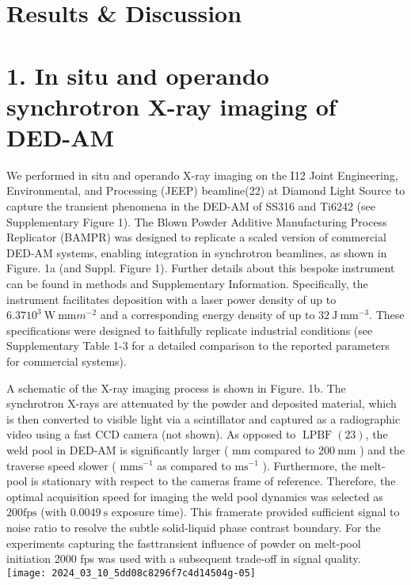 \documentclass[10pt]{article}
\begin{document}
\section*{Results \& Discussion}
\section*{1. In situ and operando synchrotron X-ray imaging of DED-AM}
We performed in situ and operando X-ray imaging on the I12 Joint Engineering, Environmental, and Processing (JEEP) beamline(22) at Diamond Light Source to capture the transient phenomena in the DED-AM of SS316 and Ti6242 (see Supplementary Figure 1). The Blown Powder Additive Manufacturing Process Replicator (BAMPR) was designed to replicate a scaled version of commercial DED-AM systems, enabling integration in synchrotron beamlines, as shown in Figure. 1a (and Suppl. Figure 1). Further details about this bespoke instrument can be found in methods and Supplementary Information. Specifically, the instrument facilitates deposition with a laser power density of up to $6.3710^{3} \mathrm{~W} \mathrm{~mm} m^{-2}$ and a corresponding energy density of up to $32 \mathrm{~J} \mathrm{~mm}^{-3}$. These specifications were designed to faithfully replicate industrial conditions (see Supplementary Table 1-3 for a detailed comparison to the reported parameters for commercial systems).

A schematic of the X-ray imaging process is shown in Figure. 1b. The synchrotron X-rays are attenuated by the powder and deposited material, which is then converted to visible light via a scintillator and captured as a radiographic video using a fast CCD camera (not shown). As opposed to $\operatorname{LPBF}(23)$, the weld pool in DED-AM is significantly larger ( $\mathrm{mm}$ compared to $200 \mathrm{~mm}$ ) and the traverse speed slower ( $\mathrm{mm} \mathrm{s}^{-1}$ as compared to $\mathrm{m} \mathrm{s}^{-1}$ ). Furthermore, the melt-pool is stationary with respect to the cameras frame of reference. Therefore, the optimal acquisition speed for imaging the weld pool dynamics was selected as $200 \mathrm{fps}$ (with $0.0049 \mathrm{~s}$ exposure time). This framerate provided sufficient signal to noise ratio to resolve the subtle solid-liquid phase contrast boundary. For the experiments capturing the fasttransient influence of powder on melt-pool initiation 2000 fps was used with a subsequent trade-off in signal quality.\\
\texttt{[image: 2024\_03\_10\_5dd08c8296f7c4d14504g-05]}
\end{document}
